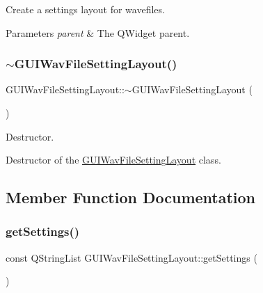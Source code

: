 Create a settings layout for wavefiles. 


\begin{DoxyParams}{Parameters}
{\em parent} & The Q\+Widget parent. \\
\hline
\end{DoxyParams}
\mbox{\label{class_g_u_i_wav_file_setting_layout_a75965c6246473c055b7ede6e23d94ca4}} 
\subsubsection{\texorpdfstring{$\sim$\+G\+U\+I\+Wav\+File\+Setting\+Layout()}{~GUIWavFileSettingLayout()}}
{\footnotesize\ttfamily G\+U\+I\+Wav\+File\+Setting\+Layout\+::$\sim$\+G\+U\+I\+Wav\+File\+Setting\+Layout (\begin{DoxyParamCaption}{ }\end{DoxyParamCaption})}



Destructor. 

Destructor of the \mbox{\hyperlink{class_g_u_i_wav_file_setting_layout}{G\+U\+I\+Wav\+File\+Setting\+Layout}} class. 

\subsection{Member Function Documentation}
\mbox{\label{class_g_u_i_wav_file_setting_layout_a92e167030a076210126e31c919e7630c}} 
\subsubsection{\texorpdfstring{get\+Settings()}{getSettings()}}
{\footnotesize\ttfamily const Q\+String\+List G\+U\+I\+Wav\+File\+Setting\+Layout\+::get\+Settings (\begin{DoxyParamCaption}{ }\end{DoxyParamCaption})\hspace{0.3cm}{\ttfamily [virtual]}}



